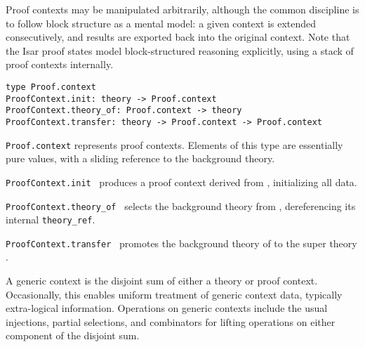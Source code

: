 \begin{isabellebody}
\begin{isamarkuptext}
  Proof contexts may be manipulated arbitrarily, although the common
  discipline is to follow block structure as a mental model: a given
  context is extended consecutively, and results are exported back
  into the original context.  Note that the Isar proof states model
  block-structured reasoning explicitly, using a stack of proof
  contexts internally.%
\end{isamarkuptext}%
\isamarkuptrue%
%
\isadelimmlref
%
\endisadelimmlref
%
\isatagmlref
%
\begin{isamarkuptext}%
\begin{mldecls}
  \verb|type Proof.context| \\
  \verb|ProofContext.init: theory -> Proof.context| \\
  \verb|ProofContext.theory_of: Proof.context -> theory| \\
  \verb|ProofContext.transfer: theory -> Proof.context -> Proof.context| \\
  \end{mldecls}

  \begin{description}

  \item \verb|Proof.context| represents proof contexts.  Elements
  of this type are essentially pure values, with a sliding reference
  to the background theory.

  \item \verb|ProofContext.init|~ produces a proof context
  derived from , initializing all data.

  \item \verb|ProofContext.theory_of|~ selects the
  background theory from , dereferencing its internal
  \verb|theory_ref|.

  \item \verb|ProofContext.transfer|~ promotes the
  background theory of  to the super theory .

  \end{description}%
\end{isamarkuptext}%
\isamarkuptrue%
%
\endisatagmlref
{\isafoldmlref}%
%
\isadelimmlref
%
\endisadelimmlref
%
\isamarkuptrue%
%
\begin{isamarkuptext}%
A generic context is the disjoint sum of either a theory or proof
  context.  Occasionally, this enables uniform treatment of generic
  context data, typically extra-logical information.  Operations on
  generic contexts include the usual injections, partial selections,
  and combinators for lifting operations on either component of the
  disjoint sum.


\end{isamarkuptext}
\end{isabellebody}
